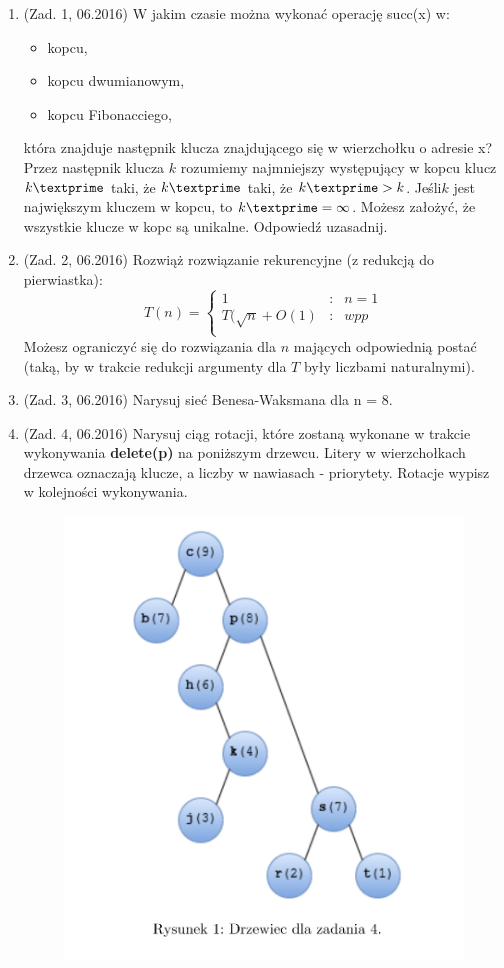\documentclass[10pt]{article}%
\begin{document}
\begin{enumerate}
-----------------------------------------------------
\item (Zad. 1, 06.2016) W jakim czasie można wykonać operację succ(x) w:
\begin{itemize}
\item kopcu,
\item kopcu dwumianowym,
\item kopcu Fibonacciego,
\end{itemize}
która znajduje następnik klucza znajdującego się w wierzchołku o adresie x? Przez następnik klucza $k$ rozumiemy najmniejszy występujący w kopcu klucz $k\textprime$ taki, że $k\textprime$ taki, że $ k\textprime > k$. Jeśli$k$ jest największym kluczem w kopcu, to $k\textprime = \infty$. Możesz założyć, że wszystkie klucze w kopc są unikalne. Odpowiedź uzasadnij.
\item (Zad. 2, 06.2016) Rozwiąż rozwiązanie rekurencyjne (z redukcją do pierwiastka):
$$T(n) = \left\{\begin{array}{rcl}
1&:&n=1\\
T(\sqrt{n}+O(1)&:&wpp\\
\end{array} \right.$$
Możesz ograniczyć się do rozwiązania dla $n$ mających odpowiednią postać (taką, by w trakcie redukcji argumenty dla $T$ były liczbami naturalnymi).
\item (Zad. 3, 06.2016) Narysuj sieć Benesa-Waksmana dla n = 8.
\item (Zad. 4, 06.2016) Narysuj ciąg rotacji, które zostaną wykonane w trakcie wykonywania \textbf{delete(p)} na poniższym drzewcu. Litery w wierzchołkach drzewca oznaczają klucze, a liczby w nawiasach - priorytety. Rotacje wypisz w kolejności wykonywania.
\begin{figure}[H]
\includegraphics[scale=0.8]{z40616.png}

\end{figure}
\end{enumerate}
\end{document}
